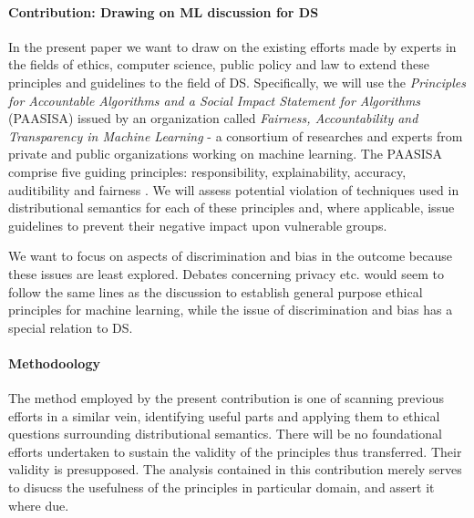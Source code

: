 \documentclass{article}
\begin{document}
\paragraph{Contribution: Drawing on ML discussion for DS}
In the present paper we want to draw on the existing efforts made by experts in the fields of ethics, computer science, public policy and law to extend these principles and guidelines to the field of DS. Specifically, we will use the \emph{Principles for Accountable Algorithms and a Social Impact Statement for Algorithms} (PAASISA) issued by an organization called \emph{Fairness, Accountability and Transparency in Machine Learning} - a consortium of researches and experts from private and public organizations working on machine learning. 
The PAASISA comprise five guiding principles: responsibility, explainability, accuracy, auditibility and fairness \cite{principles}.
We will assess potential violation of techniques used in distributional semantics for each of these principles and, where applicable, issue guidelines to prevent their negative impact upon vulnerable groups. 

We want to focus on aspects of discrimination and bias in the outcome because these issues are least explored. Debates concerning privacy etc. would seem to follow the same lines as the discussion to establish general purpose ethical principles for machine learning, while the issue of discrimination and bias has a special relation to DS.

\paragraph{Methodoology}
The method employed by the present contribution is one of scanning previous efforts in a similar vein, identifying useful parts and applying them to ethical questions surrounding distributional semantics. There will be no foundational efforts undertaken to sustain the validity of the principles thus transferred.  Their validity is presupposed. The analysis contained in this contribution merely serves to disucss the usefulness of the principles in particular domain, and assert it where due.
\end{document}
